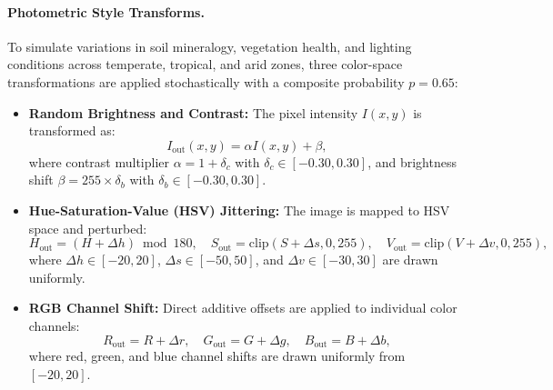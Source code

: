 \documentclass[12pt,a4paper]{article}
\begin{document}
\paragraph{Photometric Style Transforms.}
To simulate variations in soil mineralogy, vegetation health, and lighting conditions across temperate, tropical, and arid zones, three color-space transformations are applied stochastically with a composite probability $p = 0.65$:
\begin{itemize}[leftmargin=*]
    \item \textbf{Random Brightness and Contrast:} The pixel intensity $I(x, y)$ is transformed as:
    \begin{equation}
        I_{\text{out}}(x, y) = \alpha I(x, y) + \beta,
    \end{equation}
    where contrast multiplier $\alpha = 1 + \delta_c$ with $\delta_c \in [-0.30, 0.30]$, and brightness shift $\beta = 255 \times \delta_b$ with $\delta_b \in [-0.30, 0.30]$.
    
    \item \textbf{Hue-Saturation-Value (HSV) Jittering:} The image is mapped to HSV space and perturbed:
    \begin{equation}
        H_{\text{out}} = (H + \Delta h) \bmod 180, \quad S_{\text{out}} = \text{clip}(S + \Delta s, 0, 255), \quad V_{\text{out}} = \text{clip}(V + \Delta v, 0, 255),
    \end{equation}
    where $\Delta h \in [-20, 20]$, $\Delta s \in [-50, 50]$, and $\Delta v \in [-30, 30]$ are drawn uniformly.
    
    \item \textbf{RGB Channel Shift:} Direct additive offsets are applied to individual color channels:
    \begin{equation}
        R_{\text{out}} = R + \Delta r, \quad G_{\text{out}} = G + \Delta g, \quad B_{\text{out}} = B + \Delta b,
    \end{equation}
    where red, green, and blue channel shifts are drawn uniformly from $[-20, 20]$.
\end{itemize}
\end{document}
